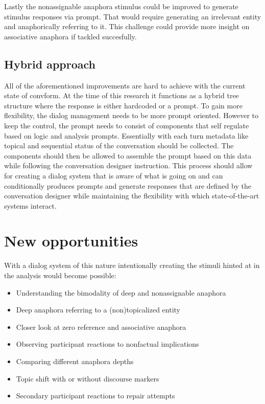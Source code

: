\documentclass[12pt]{report}
\begin{document}
{        Lastly the nonassignable anaphora stimulus could be improved to generate stimulus responses via prompt.
        That would require generating an irrelevant entity and anaphorically referring to it.
        This challenge could provide more insight on associative anaphora if tackled succesfully.

    \subsection{Hybrid approach}

            All of the aforementioned improvements are hard to achieve with the current state of convform.
            At the time of this research it functions as a hybrid tree structure where the response is either
            hardcoded or a prompt.
            To gain more flexibility, the dialog management needs to be more prompt oriented.
            However to keep the control, the prompt needs to consist of components that self regulate based on
            logic and analysis prompts.
            Essentially with each turn metadata
            like topical and sequential status of the conversation should be collected.
            The components should then be allowed to assemble the prompt
            based on this data while following the conversation designer instruction.
            This process should allow for creating a dialog system that is aware of what is going on
            and can conditionally produces prompts and generate responses
            that are defined by the conversation designer
            while maintaining the flexibility with which state-of-the-art systems interact.

\section{New opportunities}

With a dialog system of this nature
intentionally creating the stimuli hinted at in the analysis would become possible:

    \begin{itemize}
    \item{Understanding the bimodality of deep and nonassignable anaphora}
    \item{Deep anaphora referring to a (non)topicalized entity}
    \item{Closer look at zero reference and associative anaphora}
    \item{Observing participant reactions to nonfactual implications}
    \item{Comparing different anaphora depths}
    \item{Topic shift with or without discourse markers}
    \item{Secondary participant reactions to repair attempts}
    \end{itemize}

}
\end{document}
